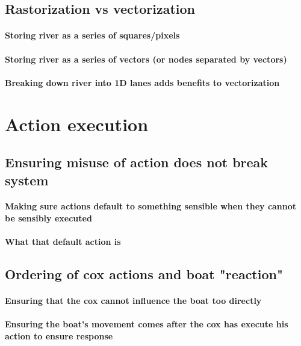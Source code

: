     \subsection{Rastorization vs vectorization}
      \paragraph{Storing river as a series of squares/pixels}
      \paragraph{Storing river as a series of vectors (or nodes separated by vectors)}
      \paragraph{Breaking down river into 1D lanes adds benefits to vectorization}

  \section{Action execution}
    \subsection{Ensuring misuse of action does not break system}
      \paragraph{Making sure actions default to something sensible when they cannot be sensibly executed}
      \paragraph{What that default action is}
      
    \subsection{Ordering of cox actions and boat "reaction"}
      \paragraph{Ensuring that the cox cannot influence the boat too directly}
      \paragraph{Ensuring the boat's movement comes after the cox has execute his action to ensure response}
